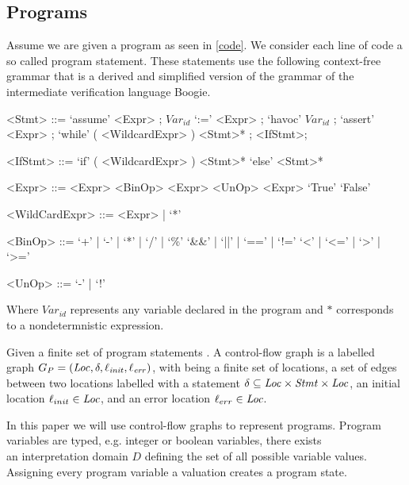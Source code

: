 \subsection{Programs}
Assume we are given a program as seen in \ref{code}. We consider each line of code a so called program statement. These statements use the following context-free grammar that is a derived and simplified version of the grammar of the intermediate verification language Boogie\cite{Boogie}.
\setlength{\grammarparsep}{20pt plus 1pt minus 1pt} %
\setlength{\grammarindent}{12em} %
\begin{grammar}
	<Stmt> ::= `assume' <Expr> ;
	\alt $Var_{id}$ `:=' <Expr> ;
	\alt `havoc' $Var_{id}$ ;
	\alt `assert' <Expr> ;
	\alt `while' ( <WildcardExpr> ) <Stmt>* ;
	\alt <IfStmt>;
	
	<IfStmt> ::= `if' ( <WildcardExpr> ) <Stmt>* `else' <Stmt>*

	<Expr> ::= <Expr> <BinOp> <Expr>
	\alt <UnOp> <Expr>
	\alt `True'
	\alt `False'
		
	<WildCardExpr> ::= <Expr> | `*'
	
	<BinOp> ::= `+' | `-' | `*' | `/' | `\%'
	\alt `\&\&' | `||' | `==' | `!='
	\alt `<' | `<=' | `>' | `>='
	
	<UnOp> ::= `-' | `!'
\end{grammar}
Where $Var_{id}$ represents any variable declared in the program and $*$ corresponds to a nondetermnistic expression.

\begin{mydef}
	Given a finite set of program statements \stmt. A control-flow graph is a labelled graph $G_P = (\mathit{Loc}, \delta, \ell_{\mathit{init}}, \ell_{\mathit{err}})$, with
	\Loc being a finite set of locations,
	a set of edges between two locations labelled with a statement $\delta \subseteq \mathit{Loc} \times \mathit{Stmt} \times \mathit{Loc}$,
	an initial location $\ell_{init} \in \mathit{Loc}$, and
	an error location $\ell_{err} \in \mathit{Loc}$.
\end{mydef}
In this paper we will use control-flow graphs to represent programs.
Program variables are typed, e.g. integer or boolean variables, there exists \\
an interpretation domain $D$ defining the set of all possible variable values.
Assigning every program variable a valuation creates a program state.

